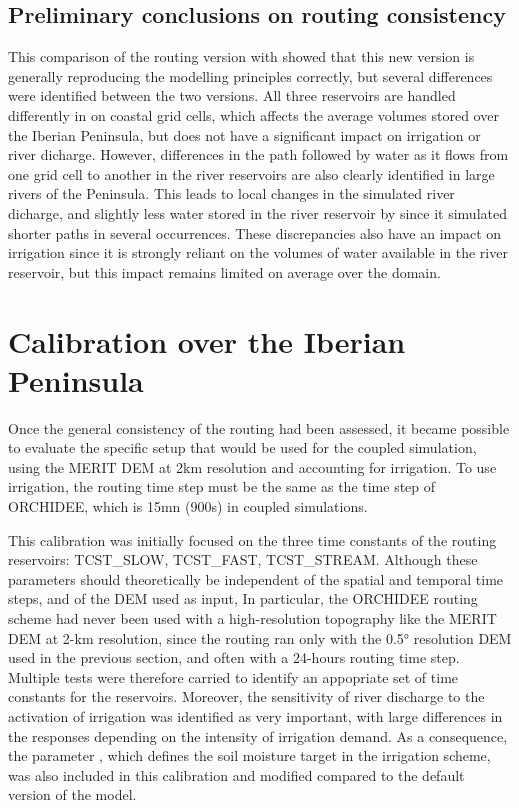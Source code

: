 \subsection{Preliminary conclusions on \native routing consistency}
This comparison of the \native routing version with \std showed that this new version is generally reproducing the modelling principles correctly, but several differences were identified between the two versions. All three reservoirs are handled differently in \native on coastal grid cells, which affects the average volumes stored over the Iberian Peninsula, but does not have a significant impact on irrigation or river dicharge. However, differences in the path followed by water as it flows from one grid cell to another in the river reservoirs are also clearly identified in large rivers of the Peninsula. This leads to local changes in the simulated river dicharge, and slightly less water stored in the river reservoir by \native since it simulated shorter paths in several occurrences. These discrepancies also have an impact on irrigation since it is strongly reliant on the volumes of water available in the river reservoir, but this impact remains limited on average over the domain.

\section{Calibration over the Iberian Peninsula}
\label{section:calib}

Once the general consistency of the \native routing had been assessed, it became possible to evaluate the specific setup that would be used for the coupled simulation, using the MERIT DEM at 2km resolution and accounting for irrigation. To use irrigation, the routing time step must be the same as the time step of ORCHIDEE, which is 15mn (900s) in coupled simulations. 

This calibration was initially focused on the three time constants of the routing reservoirs: TCST\_SLOW, TCST\_FAST, TCST\_STREAM. Although these parameters should theoretically be independent of the spatial and temporal time steps, and of the DEM used as input, 
In particular, the ORCHIDEE routing scheme had never been used with a high-resolution topography like the MERIT DEM at 2-km resolution, since the \std routing ran only with the 0.5° resolution DEM used in the previous section, and often with a 24-hours routing time step. Multiple tests were therefore carried to identify an appopriate set of time constants for the reservoirs.
Moreover, the sensitivity of river discharge to the activation of irrigation was identified as very important, with large differences in the responses depending on the intensity of irrigation demand. As a consequence, the parameter \betairrig, which defines the soil moisture target in the irrigation scheme, was also included in this calibration and modified compared to the default version of the model.

